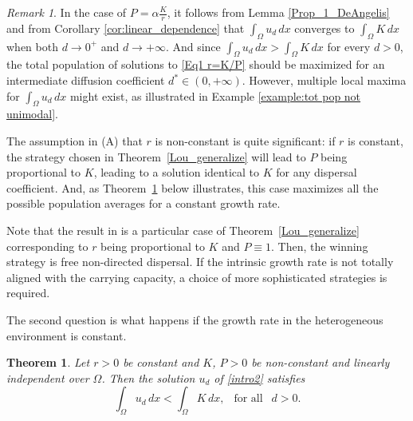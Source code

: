 \documentclass[11pt]{article}
\newtheorem{theorem}[statement]{Theorem}
\theoremstyle{definition}
\theoremstyle{remark}
\newtheorem{remark}[statement]{Remark}
\begin{document}
\begin{remark}\label{remark:Lou generalized}
In the case of $P=\alpha\frac{K}{r}$, it follows from Lemma \ref{Prop_1_DeAngelis} and from Corollary \ref{cor:linear_dependence} that $\int_\Omega u_d\,dx$ converges to $\int_\Omega K\,dx$ when both $d\to0^+$ and $d\to+\infty$. And since $\int_\Omega u_d\,dx>\int_\Omega K\,dx$ for every $d>0$, the total population of solutions to \eqref{Eq1 r=K/P} should be maximized for an intermediate diffusion coefficient $d^*\in(0,+\infty)$. However, multiple local maxima for $\int_\Omega u_d\,dx$ might exist, as illustrated in Example \ref{example:tot pop not unimodal}.

The assumption in (A) that $r$ is non-constant is quite significant: if $r$ is constant, the strategy chosen in Theorem~\ref{Lou_generalize} will lead to $P$ being proportional to $K$, leading to a solution identical to $K$ for any dispersal coefficient. And, as Theorem~\ref{th_const_growth_rate} below illustrates, this case maximizes all the possible population averages for a constant growth rate.

\end{remark}

Note that the result in \cite{Lou} is a particular case of Theorem~\ref{Lou_generalize} corresponding to $r$ being proportional to $K$ and $P\equiv1$. Then, the winning strategy is free non-directed dispersal. 
If the intrinsic growth rate is not totally aligned with the carrying capacity, a choice of more sophisticated strategies is required.

The second question is what happens if the growth rate in the heterogeneous environment is constant.

\begin{theorem}
\label{th_const_growth_rate}
    Let $r>0$ be constant and $K$, $P>0$ be non-constant and linearly independent over $\Omega$. Then the solution $u_d$ of \eqref{intro2} satisfies
    \begin{equation*}
        \int_\Omega u_d\,dx<\int_\Omega K\,dx,~~\textrm{ for all }~~d>0.
    \end{equation*}
\end{theorem}
\end{document}
